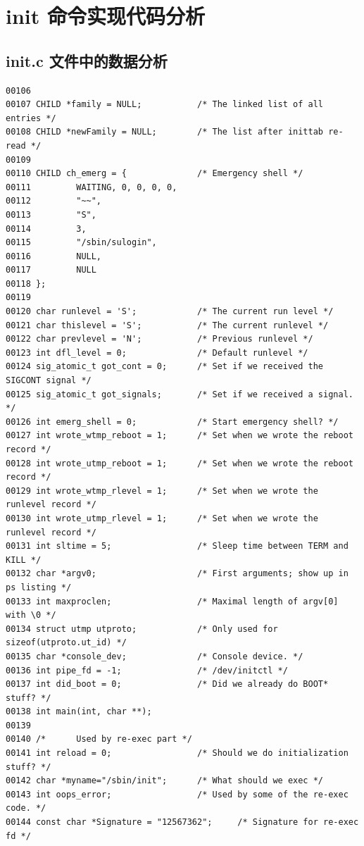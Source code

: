 \section{init 命令实现代码分析}

\subsection{init.c 文件中的数据分析}

{\begin{shaded}\begin{verbatim}
00106 
00107 CHILD *family = NULL;           /* The linked list of all entries */
00108 CHILD *newFamily = NULL;        /* The list after inittab re-read */
00109 
00110 CHILD ch_emerg = {              /* Emergency shell */
00111         WAITING, 0, 0, 0, 0,
00112         "~~",
00113         "S",
00114         3,
00115         "/sbin/sulogin",
00116         NULL,
00117         NULL
00118 };
00119 
00120 char runlevel = 'S';            /* The current run level */
00121 char thislevel = 'S';           /* The current runlevel */
00122 char prevlevel = 'N';           /* Previous runlevel */
00123 int dfl_level = 0;              /* Default runlevel */
00124 sig_atomic_t got_cont = 0;      /* Set if we received the SIGCONT signal */
00125 sig_atomic_t got_signals;       /* Set if we received a signal. */
00126 int emerg_shell = 0;            /* Start emergency shell? */
00127 int wrote_wtmp_reboot = 1;      /* Set when we wrote the reboot record */
00128 int wrote_utmp_reboot = 1;      /* Set when we wrote the reboot record */
00129 int wrote_wtmp_rlevel = 1;      /* Set when we wrote the runlevel record */
00130 int wrote_utmp_rlevel = 1;      /* Set when we wrote the runlevel record */
00131 int sltime = 5;                 /* Sleep time between TERM and KILL */
00132 char *argv0;                    /* First arguments; show up in ps listing */
00133 int maxproclen;                 /* Maximal length of argv[0] with \0 */
00134 struct utmp utproto;            /* Only used for sizeof(utproto.ut_id) */
00135 char *console_dev;              /* Console device. */
00136 int pipe_fd = -1;               /* /dev/initctl */
00137 int did_boot = 0;               /* Did we already do BOOT* stuff? */
00138 int main(int, char **);
00139 
00140 /*      Used by re-exec part */
00141 int reload = 0;                 /* Should we do initialization stuff? */
00142 char *myname="/sbin/init";      /* What should we exec */
00143 int oops_error;                 /* Used by some of the re-exec code. */
00144 const char *Signature = "12567362";     /* Signature for re-exec fd */
\end{verbatim}\end{shaded}}
